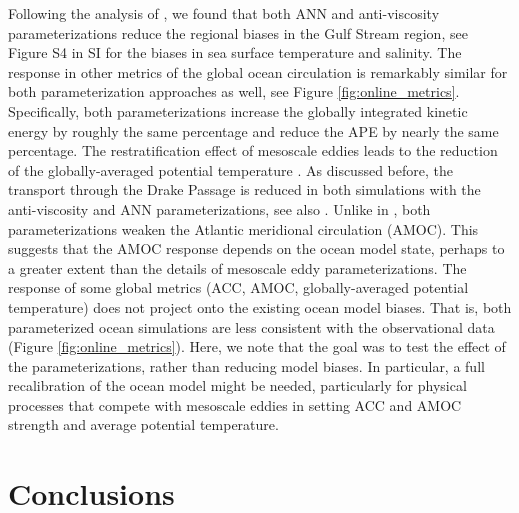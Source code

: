 \documentclass[draft]{agujournal2019}
\begin{document}
Following the analysis of , we found that both ANN and anti-viscosity parameterizations reduce the regional biases in the Gulf Stream region, see Figure S4 in SI for the biases in sea surface temperature and salinity. The response in other metrics of the global ocean circulation is remarkably similar for both parameterization approaches as well, see Figure \ref{fig:online_metrics}. Specifically, both parameterizations increase the globally integrated kinetic energy by roughly the same percentage and reduce the APE by nearly the same percentage. The restratification effect of mesoscale eddies leads to the reduction of the globally-averaged potential temperature \cite{griffies2015impacts, adcroft2019gfdl}. As discussed before, the transport through the Drake Passage is reduced in both simulations with the anti-viscosity and ANN parameterizations, see also . Unlike in , both parameterizations weaken the Atlantic meridional circulation (AMOC). This suggests that the AMOC response depends on the ocean model state, perhaps to a greater extent than the details of mesoscale eddy parameterizations. The response of some global metrics (ACC, AMOC, globally-averaged potential temperature) does not project onto the existing ocean model biases. 
That is, both parameterized ocean simulations are less consistent with the observational data (Figure \ref{fig:online_metrics}). 
Here, we note that the goal was to test the effect of the parameterizations, rather than reducing model biases.  In particular, a full recalibration of the ocean model might be needed, particularly for physical processes that compete with mesoscale eddies in setting ACC and AMOC strength and average potential temperature. 

\section{Conclusions}


\end{document}
